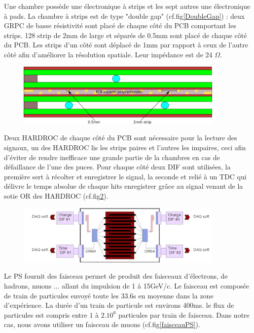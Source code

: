 Une chambre possède une électronique à strips et les sept autres une électronique à pads. La chambre à strips est de type "double gap" (cf.fig\ref{DoubleGap}) : deux GRPC de basse résistivité sont placé de chaque côté du PCB comportant les strips. 128 strip de 2mm de large et séparés de 0.5mm sont placé de chaque côté du PCB. Les strips d'un côté sont déplacé de 1mm par rapport à ceux de l'autre côté afin d'améliorer la résolution spatiale. Leur impédance est de 24 $\Omega$. 

\begin{figure}[ht!]
	\centering
	\includegraphics[width=0.9\textwidth]{GLA/DoubleGap.png}
	\label{DoubleGa}
\end{figure}

Deux HARDROC de chaque côté du PCB sont nécessaire pour la lecture des signaux, un des HARDROC lis les strips paires et l'autres les impaires, ceci afin d'éviter de rendre inefficace une grande partie de la chambres en cas de défaillance de l'une des puces. Pour chaque côté deux DIF sont utilisées, la première sert à récolter et enregistrer le signal, la seconde et relié à un TDC qui délivre le temps absolue de chaque hits enregistrer grâce au signal venant de la sotie OR des HARDROC (cf.fig\ref{SchemePS}).

\begin{figure}[ht!]
	\centering
	\includegraphics[width=0.9\textwidth]{GLA/SchemePS.png}
	\label{SchemePS}
\end{figure}

Le PS fournit des faisceau permet de produit des faisceaux d'électrons, de hadrons, muons ... allant du impulsion de 1 à 15GeV/c. Le faisceau est composée de train de particules envoyé toute les 33.6s en moyenne dans la zone d'expérience. La durée d'un train de particule est environs 400ms. le flux de particules est compris entre $1$ à $2.10^{6}$ particules par train de faisceau. Dans notre cas, nous avons utiliser un faisceau de muons (cf.fig\ref{faisceauPS}).
 

